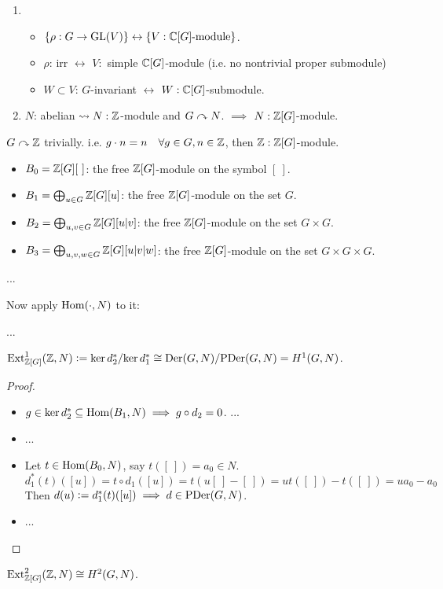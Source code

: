 \begin{remark} \mbox{}
  \begin{enumerate}
    \item
      \begin{itemize}
        \item $\{ \rho: G\to \text{GL}(V) \} \leftrightarrow
          \{ V: \mathbb{C}[G]\text{-module} \}$.
        \item $\rho$: irr $\leftrightarrow$
          $V:$ simple $\mathbb{C}[G]$-module (i.e. no nontrivial proper submodule)
        \item $W \subset V$: $G$-invariant $\leftrightarrow$
          $W: \mathbb{C}[G]$-submodule.
      \end{itemize}
    \item $N$: abelian $\leadsto N: \mathbb{Z}$-module and $G \curvearrowright N$. $\implies$
      $N: \mathbb{Z}[G]$-module.
  \end{enumerate}
\end{remark}

\begin{definition}
  $G \curvearrowright \mathbb{Z}$ trivially. i.e. $g\cdot n = n \quad \forall g \in G,
  n \in \mathbb{Z}$, then $\mathbb{Z}: \mathbb{Z}[G]$-module.

  \begin{itemize}
    \item $B_0 = \mathbb{Z}[G][~]$: the free $\mathbb{Z}[G]$-module on the symbol $[~]$.
    \item $B_1 = \bigoplus_{u\in G} \mathbb{Z}[G][u]$: the free $\mathbb{Z}[G]$-module on the
      set $G$.
    \item $B_2 = \bigoplus_{u, v\in G} \mathbb{Z}[G][u|v]$: the free
      $\mathbb{Z}[G]$-module on the set $G \times G$.
    \item $B_3 = \bigoplus_{u, v, w\in G} \mathbb{Z}[G][u|v|w]$: the free
      $\mathbb{Z}[G]$-module on the set $G \times G \times G$.
  \end{itemize}
\end{definition}


...

Now apply $\operatorname{Hom}(\cdot, N)$ to it:

...

\begin{theorem}
  $\operatorname{Ext}^1_{\mathbb{Z}[G]}(\mathbb{Z}, N) \vcentcolon= {\ker d_2^*}/{\ker d_1^*}
  \cong {\operatorname{Der}(G, N)}/{\operatorname{PDer}(G, N)} = H^1(G, N)$.
  \begin{proof} \mbox{}
    \begin{itemize}
      \item $g\in \ker d_2^* \subseteq \operatorname{Hom}(B_1, N) \implies g\circ d_2 = 0$.
        ...
      \item ...
      \item Let $t\in \operatorname{Hom}(B_0, N)$, say $t([~]) = a_0 \in N$.
        \[ d_1^*(t)([u]) = t\circ d_1([u]) = t(u[~]-[~]) = ut([~])-t([~])
        = ua_0 - a_0 \]
        Then $d(u) \vcentcolon= d_1^*(t)([u]) \implies d \in \operatorname{PDer}(G, N)$.
      \item ...
    \end{itemize}
  \end{proof}
\end{theorem}

\begin{remark}
  $\operatorname{Ext}^2_{\mathbb{Z}[G]}(\mathbb{Z}, N) \cong H^2(G, N)$.
\end{remark}
